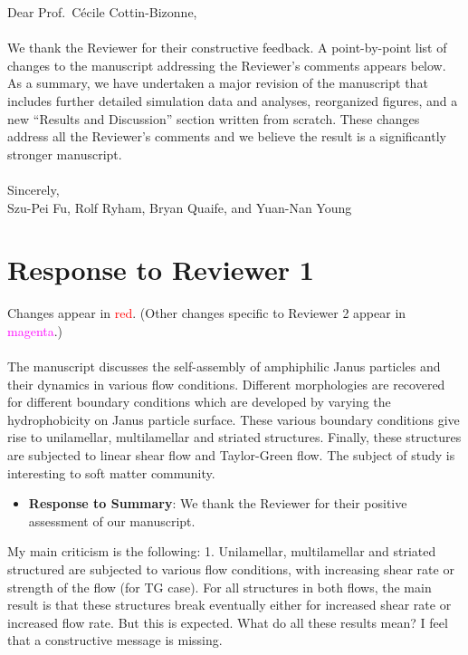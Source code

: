 \documentclass[11pt]{article}
\newcommand{\comment}[1]{{\color{blue} #1}}
\begin{document}
\noindent
Dear Prof.~C\'ecile Cottin-Bizonne,
\\ \\
\noindent 
We thank the Reviewer for their constructive feedback.
A point-by-point list of changes to the manuscript 
addressing the Reviewer's comments appears below.\\

\noindent As a summary, we have undertaken a major revision of the manuscript
that includes further detailed simulation data and analyses,
reorganized figures, and a new ``Results and Discussion'' section
written from scratch.  These changes address all the Reviewer's
comments and we believe the result is a significantly stronger manuscript.
\\ \\
\noindent
Sincerely,
\\
\noindent
Szu-Pei Fu, Rolf Ryham, Bryan Quaife, and Yuan-Nan Young

\section*{Response to Reviewer 1}

\noindent Changes appear in \textcolor{red}{red}.
(Other changes specific to Reviewer 2 appear in \textcolor{magenta}{magenta}.)\\ \\

\noindent
\comment{The manuscript discusses the self-assembly of amphiphilic Janus
particles and their dynamics in various flow conditions. Different
morphologies are recovered for different boundary conditions which are
developed by varying the hydrophobicity on Janus particle surface.
These various boundary conditions give rise to unilamellar,
multilamellar and striated structures. Finally, these structures are
subjected to linear shear flow and Taylor-Green flow. The subject of
study is interesting to soft matter community.}

\begin{itemize}
  \item {\bf Response to Summary}: We thank the Reviewer for their
    positive assessment of our manuscript.  
\end{itemize}


\noindent
\comment{My main criticism is the following: 1. Unilamellar,
multilamellar and striated structured are subjected to various flow
conditions, with increasing shear rate or strength of the flow (for TG
case). For all structures in both flows, the main result is that these
structures break eventually either for increased shear rate or increased
flow rate. But this is expected. What do all these results mean? I feel
that a constructive message is missing.}
\end{document}
